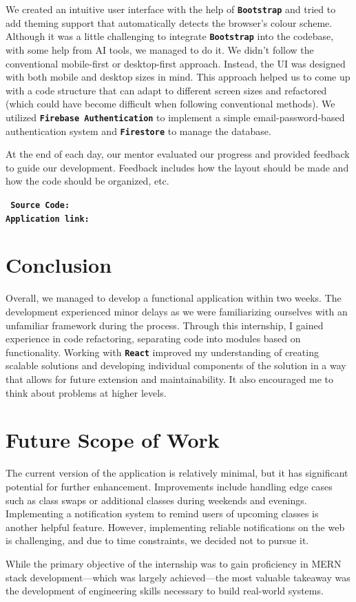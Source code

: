 \documentclass[12pt, a4paper]{article}
\newcommand{\ttbold}[1]{\textbf{\texttt{#1}}}
\begin{document}
We created an intuitive user interface with the help of \ttbold{Bootstrap} and tried to add theming support that automatically detects the browser's colour scheme.
Although it was a little challenging to integrate \ttbold{Bootstrap} into the codebase, with some help from AI tools, we managed to do it.
We didn't follow the conventional mobile-first or desktop-first approach.
Instead, the UI was designed with both mobile and desktop sizes in mind.
This approach helped us to come up with a code structure that can adapt to different screen sizes and refactored (which could have become difficult when following conventional methods).
We utilized \ttbold{Firebase Authentication} to implement a simple email-password-based authentication system and \ttbold{Firestore} to manage the database.

At the end of each day, our mentor evaluated our progress and provided feedback to guide our development.
Feedback includes how the layout should be made and how the code should be organized, etc.
\begin{framed}
	\noindent
	\ttbold{%
		Source Code: \href{https://github.com/Roopesh2/attendence-tracker-cu/}{\color{blue}{https://github.com/Roopesh2/attendence-tracker-cu/}}\\
		Application link: \href{https://attendance-tracker-364b5.web.app/}{\color{blue}{https://attendance-tracker-364b5.web.app/}}
	}
\end{framed}
\section*{Conclusion}
Overall, we managed to develop a functional application within two weeks.
The development experienced minor delays as we were familiarizing ourselves with an unfamiliar framework during the process.
Through this internship, I gained experience in code refactoring, separating code into modules based on functionality.
Working with \ttbold{React} improved my understanding of creating scalable solutions and developing individual components of the solution in a way that allows for future extension and maintainability.
It also encouraged me to think about problems at higher levels.

\section*{Future Scope of Work}
The current version of the application is relatively minimal, but it has significant potential for further enhancement.
Improvements include handling edge cases such as class swaps or additional classes during weekends and evenings.
Implementing a notification system to remind users of upcoming classes is another helpful feature.
However, implementing reliable notifications on the web is challenging, and due to time constraints, we decided not to pursue it.

While the primary objective of the internship was to gain proficiency in MERN stack development—which was largely achieved—the most valuable takeaway was the development of engineering skills necessary to build real-world systems.
\end{document}
